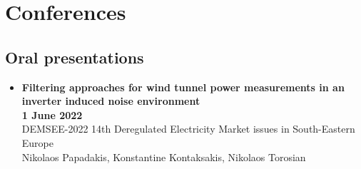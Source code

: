\documentclass[a4paper,9pt]{extarticle}
\begin{document}


\section*{Conferences}
\subsection*{Oral presentations}
\noindent
\begin{itemize}
  \item{\textbf{Filtering approaches for wind tunnel power measurements in an inverter
        induced noise environment}} \\
        \textbf{1 June 2022} \\
        DEMSEE-2022 14th Deregulated Electricity Market issues in South-Eastern Europe \\
        Nikolaos Papadakis, Konstantine Kontaksakis, Nikolaos Torosian
\end{itemize}
\end{document}

